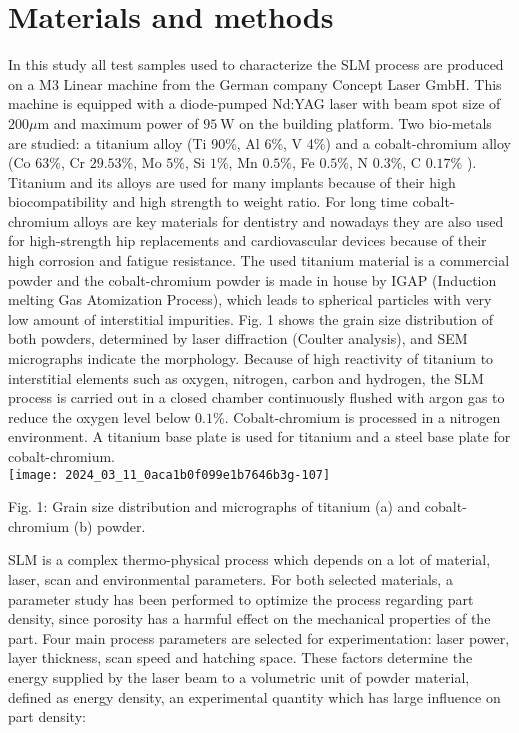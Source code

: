 \documentclass[10pt]{article}
\begin{document}
\section*{Materials and methods}
In this study all test samples used to characterize the SLM process are produced on a M3 Linear machine from the German company Concept Laser GmbH. This machine is equipped with a diode-pumped Nd:YAG laser with beam spot size of $200 \mu \mathrm{m}$ and maximum power of $95 \mathrm{~W}$ on the building platform. Two bio-metals are studied: a titanium alloy (Ti 90\%, Al 6\%, V 4\%) and a cobalt-chromium alloy (Co $63 \%$, Cr $29.53 \%$, Mo $5 \%$, Si $1 \%$, Mn $0.5 \%$, Fe $0.5 \%$, N $0.3 \%$, C $0.17 \%$ ). Titanium and its alloys are used for many implants because of their high biocompatibility and high strength to weight ratio. For long time cobalt-chromium alloys are key materials for dentistry and nowadays they are also used for high-strength hip replacements and cardiovascular devices because of their high corrosion and fatigue resistance. The used titanium material is a commercial powder and the cobalt-chromium powder is made in house by IGAP (Induction melting Gas Atomization Process), which leads to spherical particles with very low amount of interstitial impurities. Fig. 1 shows the grain size distribution of both powders, determined by laser diffraction (Coulter analysis), and SEM micrographs indicate the morphology. Because of high reactivity of titanium to interstitial elements such as oxygen, nitrogen, carbon and hydrogen, the SLM process is carried out in a closed chamber continuously flushed with argon gas to reduce the oxygen level below $0.1 \%$. Cobalt-chromium is processed in a nitrogen environment. A titanium base plate is used for titanium and a steel base plate for cobalt-chromium.\\
\texttt{[image: 2024\_03\_11\_0aca1b0f099e1b7646b3g-107]}

Fig. 1: Grain size distribution and micrographs of titanium (a) and cobalt-chromium (b) powder.

SLM is a complex thermo-physical process which depends on a lot of material, laser, scan and environmental parameters. For both selected materials, a parameter study has been performed to optimize the process regarding part density, since porosity has a harmful effect on the mechanical properties of the part. Four main process parameters are selected for experimentation: laser power, layer thickness, scan speed and hatching space. These factors determine the energy supplied by the laser beam to a volumetric unit of powder material, defined as energy density, an experimental quantity which has large influence on part density:
\end{document}
